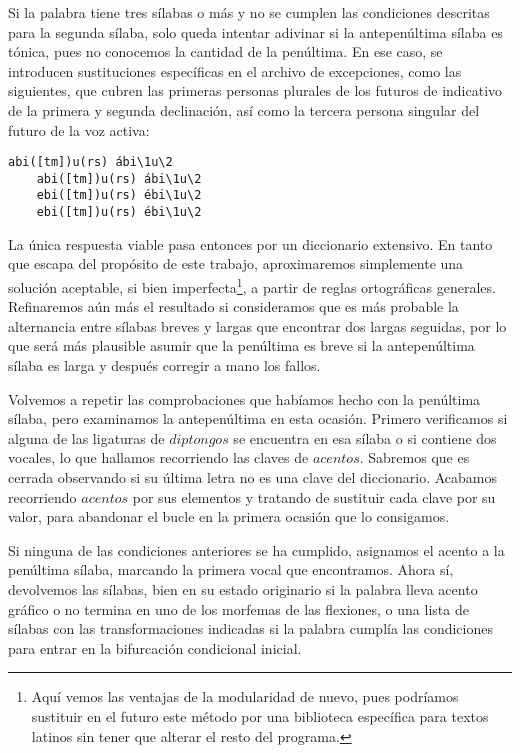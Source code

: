 Si la palabra tiene tres sílabas o más y no se cumplen las condiciones descritas para la segunda sílaba, solo queda intentar adivinar si la antepenúltima sílaba es tónica, pues no conocemos la cantidad de la penúltima. En ese caso, se introducen sustituciones específicas en el archivo de excepciones, como las siguientes, que cubren las primeras personas plurales de los futuros de indicativo de la primera y segunda declinación, así como la tercera persona singular del futuro de la voz activa:

\begin{Verbatim}[fontsize=\footnotesize,xleftmargin=5ex]
	abi([tm])u(rs) ábi\1u\2
	abi([tm])u(rs) ábi\1u\2
	ebi([tm])u(rs) ébi\1u\2
	ebi([tm])u(rs) ébi\1u\2 
\end{Verbatim}

La única respuesta viable pasa entonces por un diccionario extensivo. En tanto que escapa del propósito de este trabajo, aproximaremos simplemente una solución aceptable, si bien imperfecta\footnote{Aquí vemos las ventajas de la modularidad de nuevo, pues podríamos sustituir en el futuro este método por una biblioteca específica para textos latinos sin tener que alterar el resto del programa.}, a partir de reglas ortográficas generales. Refinaremos aún más el resultado si consideramos que es más probable la alternancia entre sílabas breves y largas que encontrar dos largas seguidas, por lo que será más plausible asumir que la penúltima es breve si la antepenúltima sílaba es larga y después corregir a mano los fallos.

Volvemos a repetir las comprobaciones que habíamos hecho con la penúltima sílaba, pero examinamos la antepenúltima en esta ocasión. Primero verificamos si alguna de las ligaturas de $diptongos$ se encuentra en esa sílaba o si contiene dos vocales, lo que hallamos recorriendo las claves de $acentos$. Sabremos que es cerrada observando si su última letra no es una clave del diccionario. Acabamos recorriendo $acentos$ por sus elementos y tratando de sustituir cada clave por su valor, para abandonar el bucle en la primera ocasión que lo consigamos.

Si ninguna de las condiciones anteriores se ha cumplido, asignamos el acento a la penúltima sílaba, marcando la primera vocal que encontramos. Ahora sí, devolvemos las sílabas, bien en su estado originario si la palabra lleva acento gráfico o no termina en uno de los morfemas de las flexiones, o una lista de sílabas con las transformaciones indicadas si la palabra cumplía las condiciones para entrar en la bifurcación condicional inicial.

